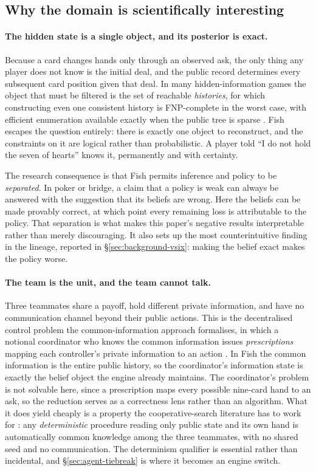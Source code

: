 \subsection{Why the domain is scientifically interesting}
\label{sec:game-why}

\paragraph{The hidden state is a single object, and its posterior is exact.}
Because a card changes hands only through an observed ask, the only thing any player does not know is
the initial deal, and the public record determines every subsequent card position given that deal. In
many hidden-information games the object that must be filtered is the set of reachable
\emph{histories}, for which constructing even one consistent history is FNP-complete in the worst
case, with efficient enumeration available exactly when the public tree is sparse
\cite{solinas-history}. Fish escapes the question entirely: there is exactly one object to
reconstruct, and the constraints on it are logical rather than probabilistic. A player told ``I do not
hold the seven of hearts'' knows it, permanently and with certainty.

The research consequence is that Fish permits inference and policy to be \emph{separated}. In poker
or bridge, a claim that a policy is weak can always be answered with the suggestion that its beliefs
are wrong. Here the beliefs can be made provably correct, at which point every remaining loss is
attributable to the policy. That separation is what makes this paper's negative results interpretable
rather than merely discouraging. It also sets up the most counterintuitive finding in the lineage,
reported in \S\ref{sec:background-vsix}: making the belief exact makes the policy worse.

\paragraph{The team is the unit, and the team cannot talk.}
Three teammates share a payoff, hold different private information, and have no communication channel
beyond their public actions. This is the decentralised control problem the common-information
approach formalises, in which a notional coordinator who knows the common information issues
\emph{prescriptions} mapping each controller's private information to an action
\cite{nayyar2013common}. In Fish the common information is the entire public history, so the
coordinator's information state is exactly the belief object the engine already maintains. The
coordinator's problem is not solvable here, since a prescription maps every possible nine-card hand to
an ask, so the reduction serves as a correctness lens rather than an algorithm. What it does yield
cheaply is a property the cooperative-search literature has to work for \cite{lerer2020sparta}: any
\emph{deterministic} procedure reading only public state and its own hand is automatically common
knowledge among the three teammates, with no shared seed and no communication. The determinism qualifier is essential rather than incidental, and
\S\ref{sec:agent-tiebreak} is where it becomes an engine switch.

